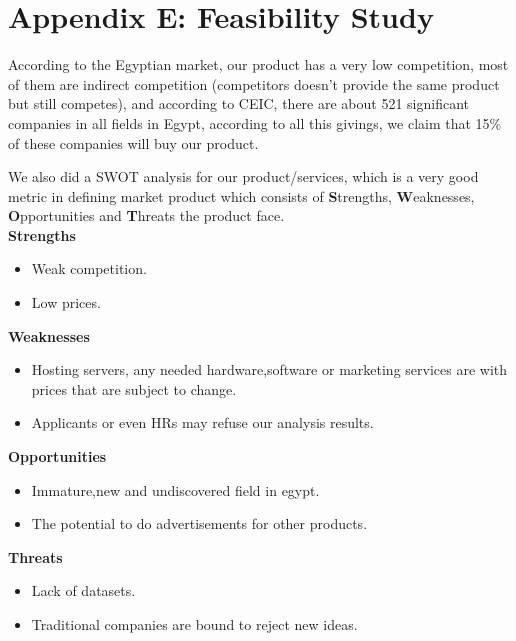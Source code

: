 \newpage
\section*{Appendix E: Feasibility Study}
According to the Egyptian market, our product has a very low competition, most of them are indirect competition (competitors doesn’t provide the same product but still competes), and according to CEIC, there are about 521 significant companies in all fields in Egypt\cite{CEIC Survey}, according to all this givings, we claim that 15\% of these companies will buy our product.\newline

We also did a SWOT analysis for our product/services, which is a very good metric in defining market product which consists of \textbf{S}trengths, \textbf{W}eaknesses, \textbf{O}pportunities and \textbf{T}hreats the product face.\\


\textbf{Strengths}
\begin{itemize}
    \item Weak competition.
    \item Low prices.
\end{itemize}

\textbf{Weaknesses}
\begin{itemize}
    \item Hosting servers, any needed hardware,software or marketing services are with prices that are subject to change. 
    \item Applicants or even HRs may refuse our analysis results.
\end{itemize}

\textbf{Opportunities}
\begin{itemize}
    \item Immature,new and undiscovered field in egypt. 
    \item The potential to do advertisements for other products.
\end{itemize}

 \textbf{Threats}
\begin{itemize}
    \item Lack of datasets. 
    \item Traditional companies are bound to reject new ideas.
\end{itemize}










